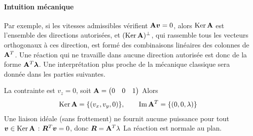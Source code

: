 \paragraph{Intuition mécanique}

Par exemple, si les vitesses admissibles vérifient $\mathbf{A}\bm{v} = 0$, alors
$\operatorname{Ker}\mathbf{A}$ est l'ensemble des directions autorisées, et
$(\operatorname{Ker}\mathbf{A})^\perp$, qui rassemble tous les vecteurs orthogonaux 
à ces direction, est formé des combinaisons linéaires des colonnes
de $\mathbf{A}^T$. Une réaction qui ne travaille dans aucune direction
autorisée est donc de la forme $\mathbf{A}^T\bm{\lambda}$. Une interprétation plus proche 
de la mécanique classique sera donnée dans les parties suivantes.

\begin{exemple}[Point attaché au plan $z = 0$]
    La contrainte est $v_z = 0$, soit
    $\mathbf{A} = \begin{pmatrix} 0 & 0 & 1 \end{pmatrix}$ Alors
    \[
        \operatorname{Ker}\mathbf{A} = \{(v_x,v_y,0)\},
        \qquad
        \operatorname{Im}\mathbf{A}^T = \{(0,0,\lambda)\}
    \]
    Une liaison idéale (sans frottement) ne fournit aucune puissance
    pour tout $\bm{v}\in\operatorname{Ker}\mathbf{A}$ : $\bm{R}^T\bm{v} = 0$,
    donc $\bm{R} = \mathbf{A}^T\lambda$ La réaction est normale au
    plan.
\end{exemple}
